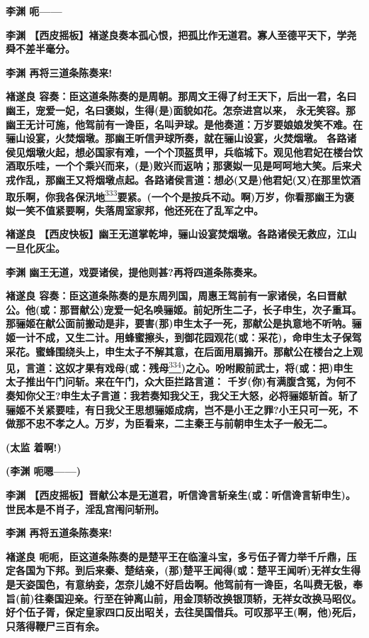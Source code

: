 \textbf{李渊 呃------}

\textbf{李渊
【西皮摇板】褚遂良奏本孤心恨，把孤比作无道君。寡人至德平天下，学尧舜不差半毫分。}

\textbf{李渊 再将三道条陈奏来!}

\textbf{褚遂良
容奏：臣这道条陈奏的是周朝。那周文王得了纣王天下，后出一君，名曰幽王，宠爱一妃，名曰褒姒，生得(是)面貌如花。怎奈进宫以来，
永无笑容。那幽王无计可施，他驾前有一谗臣，名叫尹球。是他奏道：万岁要娘娘发笑不难。在骊山设宴，火焚烟墩。那幽王听信尹球所奏，就在骊山设宴，火焚烟墩。
各路诸侯见烟墩火起，想必国家有难，一个个顶盔贯甲，兵临城下。观见他君妃在楼台饮酒取乐哇，一个个乘兴而来，(是)败兴而返呐；那褒姒一见是呵呵地大笑。后来犬戎作乱，那幽王又将烟墩点起。各路诸侯言道：想必(又是)他君妃(又)在那里饮酒取乐啊，你我各保汛地}\protect\hyperlink{fn333}{\textsuperscript{333}}\textbf{要紧。(一个个是按兵不动。啊)万岁，你看那幽王为褒姒一笑不值紧要啊，失落周室家邦，他还死在了乱军之中。}

\textbf{褚遂良
【西皮快板】幽王无道掌乾坤，骊山设宴焚烟墩。各路诸侯无救应，江山一旦化灰尘。}

\textbf{李渊 幽王无道，戏耍诸侯，提他则甚?再将四道条陈奏来。}

\textbf{褚遂良
容奏：臣这道条陈奏的是东周列国，周惠王驾前有一家诸侯，名曰晋献公。他(或：那晋献公)宠爱一妃名唤骊姬。前妃所生二子，长子申生，次子重耳。那骊姬在献公面前搬动是非，要害(那)申生太子一死，那献公是执意地不听呐。骊姬一计不成，又生二计。用蜂蜜擦头，到御花园观花(或：采花)，命申生太子保驾采花。蜜蜂围绕头上，申生太子不解其意，在后面用扇搧开。那献公在楼台之上观见，言道：这奴才果有戏母(或：残母}\protect\hyperlink{fn334}{\textsuperscript{334}}\textbf{)之心。吩咐殿前武士，将(或：把)申生太子推出午门问斩。来在午门，众大臣拦路言道：
千岁(你)有满腹含冤，为何不奏知你父王?申生太子言道：我若奏知我父王，我父王大怒，必将骊姬斩首。斩了骊姬不关紧要哇，有日我父王思想骊姬成病，岂不是小王之罪?小王只可一死，不做那不忠不孝之人。万岁，为臣看来，二主秦王与前朝申生太子一般无二。}

\textbf{(太监 着啊!)}

\textbf{(李渊 呃嗯------)}

\textbf{李渊
【西皮摇板】晋献公本是无道君，听信谗言斩亲生(或：听信谗言斩申生)。世民本是不肖子，淫乱宫闱问斩刑。}

\textbf{李渊 再将五道条陈奏来!}

\textbf{褚遂良
呃呃，臣这道条陈奏的是楚平王在临潼斗宝，多亏伍子胥力举千斤鼎，压定各国为下邦。到后来秦、楚结亲，(那)楚平王闻得(或：楚平王闻听)无祥女生得是天姿国色，有意纳妾，怎奈儿媳不好启齿啊。他驾前有一谗臣，名叫费无极，奉旨(前)往秦国迎亲。行至在钟离山前，用金顶轿改换银顶轿，无祥女改换马昭仪。好个伍子胥，保定皇家四口反出昭关，去往吴国借兵。可叹那平王(啊，他)死后，只落得鞭尸三百有余。}

